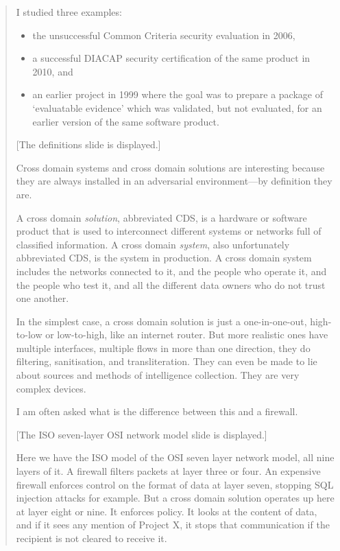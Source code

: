 \begin{quotation}
I studied three examples:
\begin{itemize}
	\item the unsuccessful Common Criteria security evaluation in 2006,
	\item a successful DIACAP security certification of the same product in 2010, and
	\item an earlier project in 1999 where the goal was to prepare a package of `evaluatable
		evidence' which was validated, but not evaluated, for an earlier version of the same
		software product.
\end{itemize}

[The definitions slide is displayed.]

Cross domain systems and cross domain solutions are interesting because they are always installed
in an adversarial environment---by definition they are.

A cross domain \emph{solution}, abbreviated CDS, is a hardware or software product that is used to
interconnect different systems or networks full of classified information.  A cross domain
\emph{system}, also unfortunately abbreviated CDS, is the system in production.  A cross domain
system includes the networks connected to it, and the people who operate it, and the people who
test it, and all the different data owners who do not trust one another.

In the simplest case, a cross domain solution is just a one-in-one-out, high-to-low or low-to-high,
like an internet router.  But more realistic ones have multiple interfaces, multiple flows in more
than one direction, they do filtering, sanitisation, and transliteration.  They can even be made to
lie about sources and methods of intelligence collection.  They are very complex devices.

I am often asked what is the difference between this and a firewall.

[The ISO seven-layer OSI network model slide is displayed.]

Here we have the ISO model of the OSI seven layer network model, all nine layers of it.  A firewall
filters packets at layer three or four.  An expensive firewall enforces control on the format of
data at layer seven, stopping SQL injection attacks for example.  But a cross domain solution
operates up here at layer eight or nine.  It enforces policy.  It looks at the content of data, and
if it sees any mention of Project X, it stops that communication if the recipient is not cleared to
receive it.


\end{quotation}

